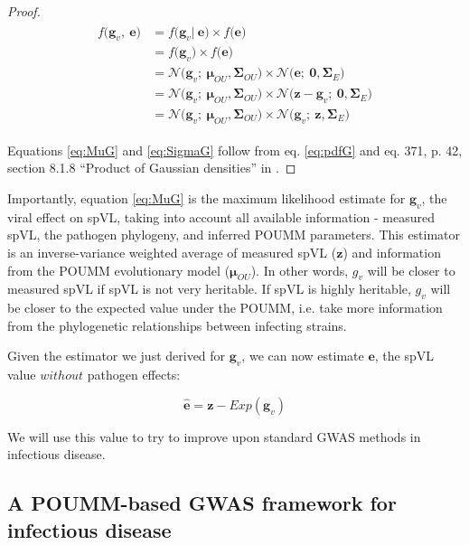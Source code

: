 \documentclass[11pt]{article}
\begin{document}
\begin{linenumbers}
\begin{proof}
	\begin{align}\label{eq:pdfG}
	\begin{split}
		f\big(\bm{g}_v,\ \bm{e}\big) &= f\big(\bm{g}_v|\ \bm{e}\big) \times f\big(\bm{e}\big) \\
	&= f\big(\bm{g}_v\big) \times f\big(\bm{e}\big) \\
	&= \mathcal{N}\big(\bm{g}_v;\ \bm{\mu}_{OU}, \mathbf{\Sigma}_{OU}\big) \times \mathcal{N}\big(\bm{e};\ \bm{0}, \mathbf{\Sigma}_E\big) \\
	&= \mathcal{N}\big(\bm{g}_v;\ \bm{\mu}_{OU}, \mathbf{\Sigma}_{OU}\big) \times \mathcal{N}\big(\bm{z} - \bm{g}_v;\ \bm{0}, \mathbf{\Sigma}_E\big) \\
	&= \mathcal{N}\big(\bm{g}_v;\ \bm{\mu}_{OU}, \mathbf{\Sigma}_{OU}\big) \times \mathcal{N}\big(\bm{g}_v;\ \bm{z}, \mathbf{\Sigma}_E\big)
	\end{split}
\end{align}
	
	Equations \ref{eq:MuG} and \ref{eq:SigmaG} follow from eq. \ref{eq:pdfG} and eq. 371, p. 42, section 8.1.8 ``Product of Gaussian densities'' in \citet{Petersen2012}.
\end{proof}

Importantly, equation \ref{eq:MuG} is the maximum likelihood estimate for $\bm{g}_v$, the viral effect on spVL, taking into account all available information - measured spVL, the pathogen phylogeny, and inferred POUMM parameters. This estimator is an inverse-variance weighted average of measured spVL ($\bm{z}$) and information from the POUMM evolutionary model ($\bm{\mu}_{OU}$). In other words, $g_v$ will be closer to measured spVL if spVL is not very heritable. If spVL is highly heritable, $g_v$ will be closer to the expected value under the POUMM, i.e. take more information from the phylogenetic relationships between infecting strains. 

Given the estimator we just derived for $\bm{g}_v$, we can now estimate $\bm{e}$, the spVL value $without$ pathogen effects: 

\begin{equation}
	\hat{\bm{e}} = \bm{z} - Exp(\bm{g}_v)
	\label{eq:EHat}
\end{equation}

We will use this value to try to improve upon standard GWAS methods in infectious disease.

\subsection*{A POUMM-based GWAS framework for infectious disease}


\end{linenumbers}
\end{document}
